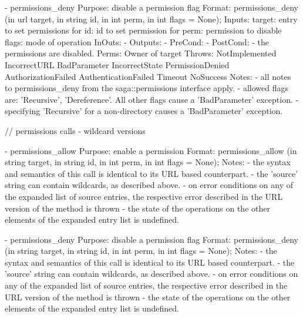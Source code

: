 \begin{myspec}
 
    - permissions_deny
      Purpose:  disable a permission flag
      Format:   permissions_deny     (in  url       target, 
                                      in  string    id,
                                      in  int       perm,
                                      in  int       flags = None);
      Inputs:   target:               entry to set permissions for
                id:                   id to set permission for
                perm:                 permission to disable
                flags:                mode of operation
      InOuts:   -
      Outputs:  -
      PreCond:  -
      PostCond: - the permissions are disabled.
      Perms:    Owner of target
      Throws:   NotImplemented
                IncorrectURL
                BadParameter
                IncorrectState
                PermissionDenied
                AuthorizationFailed
                AuthenticationFailed
                Timeout
                NoSuccess
      Notes:    - all notes to permissions_deny from the
                  saga::permissions interface apply.
                - allowed flags are: 'Recursive', 'Dereference'.
                  All other flags cause a 'BadParameter'
                  exception.
                - specifying 'Recursive' for a non-directory
                  causes a 'BadParameter' exception.
 
 
    // permissions calls - wildcard versions
 
    - permissions_allow
      Purpose:  enable a permission 
      Format:   permissions_allow    (in  string  target, 
                                      in  string  id,
                                      in  int     perm, 
                                      in  int     flags = None);
      Notes:    - the syntax and semantics of this call is 
                  identical to its URL based counterpart.  
                - the 'source' string can contain wildcards, as
                  described above.
                - on error conditions on any of the expanded 
                  list of source entries, the respective error 
                  described in the URL version of the method is 
                  thrown - the state of the operations on the 
                  other elements of the expanded entry list is 
                  undefined.
 
 
    - permissions_deny
      Purpose:  disable a permission flag
      Format:   permissions_deny     (in  string  target, 
                                      in  string  id,
                                      in  int     perm,
                                      in  int     flags = None);
      Notes:    - the syntax and semantics of this call is 
                  identical to its URL based counterpart.  
                - the 'source' string can contain wildcards, as
                  described above.
                - on error conditions on any of the expanded 
                  list of source entries, the respective error 
                  described in the URL version of the method is 
                  thrown - the state of the operations on the 
                  other elements of the expanded entry list is 
                  undefined.
 \end{myspec}
 

